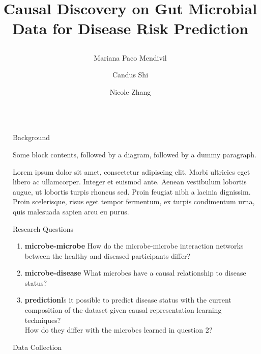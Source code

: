 \documentclass[final]{beamer}
\title{\raggedright Causal Discovery on Gut Microbial Data for Disease Risk Prediction}
\author{Mariana Paco Mendivil \inst{1} \and Candus Shi \inst{2} \and Nicole Zhang \inst{3}}
\institute[shortinst]{\inst{1} mpacomendivil@ucsd.edu \samelineand \inst{2} c6shi@ucsd.edu \inst{3} nwzhang@ucsd.edu}
\newlength{\sepwidth}
\newlength{\colwidth}
\newcommand{\separatorcolumn}{\begin{column}{\sepwidth}\end{column}}
\begin{document}
\begin{frame}[t]
\begin{columns}[t]
\separatorcolumn

\begin{column}{\colwidth}

  \begin{block}{Background}

    Some block contents, followed by a diagram, followed by a dummy paragraph.


    Lorem ipsum dolor sit amet, consectetur adipiscing elit. Morbi ultricies
    eget libero ac ullamcorper. Integer et euismod ante. Aenean vestibulum
    lobortis augue, ut lobortis turpis rhoncus sed. Proin feugiat nibh a
    lacinia dignissim. Proin scelerisque, risus eget tempor fermentum, ex
    turpis condimentum urna, quis malesuada sapien arcu eu purus.

  \end{block}

  \begin{block}{Research Questions}

    \begin{enumerate}
      \item \textbf{microbe-microbe} How do the microbe-microbe interaction networks between the healthy and diseased participants differ?
      \item \textbf{microbe-disease} What microbes have a causal relationship to disease status?
      \item \textbf{prediction}Is it possible to predict disease status with the current composition of the dataset given causal representation learning techniques? \\
      How do they differ with the microbes learned in question 2?
    \end{enumerate}
  \end{block}

  \begin{alertblock}{Data Collection}


\end{alertblock}
\end{column}
\end{columns}
\end{frame}
\end{document}
